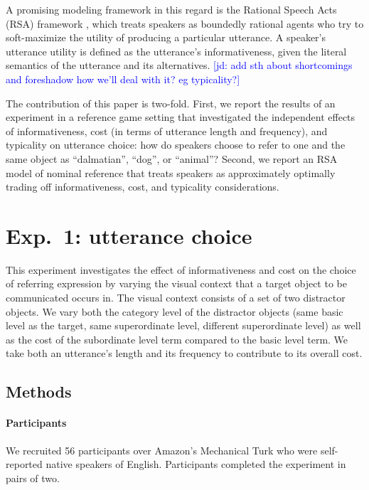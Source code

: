 \documentclass[10pt,letterpaper]{article}
\newcommand{\ndg}[1]{\textcolor{Green}{[ndg: #1]}}
\newcommand{\jd}[1]{\textcolor{Blue}{[jd: #1]}}
\begin{document}
A promising modeling framework in this regard is the Rational Speech Acts (RSA) framework \cite{frank2012, goodmanstuhlmueller2013}, which treats speakers as boundedly rational agents who try to soft-maximize the utility of producing a particular utterance. A speaker's utterance utility is defined as the utterance's informativeness, given the literal semantics of the utterance and its alternatives. \jd{add sth about shortcomings and foreshadow how we'll deal with it? eg typicality?}


The contribution of this paper is two-fold. First, we report the results of an experiment in a reference game setting that investigated the independent effects of informativeness, cost (in terms of utterance length and frequency), and typicality on utterance choice: how do speakers choose to refer to one and the same object as ``dalmatian'', ``dog'', or ``animal''? Second, we report an RSA model of nominal reference that treats speakers as approximately optimally trading off informativeness, cost, and typicality considerations.

\section{Exp.~1: utterance choice}

This experiment investigates the effect of informativeness and cost on the choice of referring expression by varying the visual context that a target object to be communicated occurs in. The visual context consists of a set of two distractor objects. We vary both the category level of the distractor objects (same basic level as the target, same superordinate level, different superordinate level) as well as the cost of the subordinate level term compared to the basic level term. We take both an utterance's  length and its frequency to contribute to its overall cost.


\subsection{\bf Methods}


\paragraph{\bf Participants}
We recruited 56 participants over Amazon's Mechanical Turk who were self-reported native speakers of English. Participants completed the experiment in pairs of two.
\end{document}
